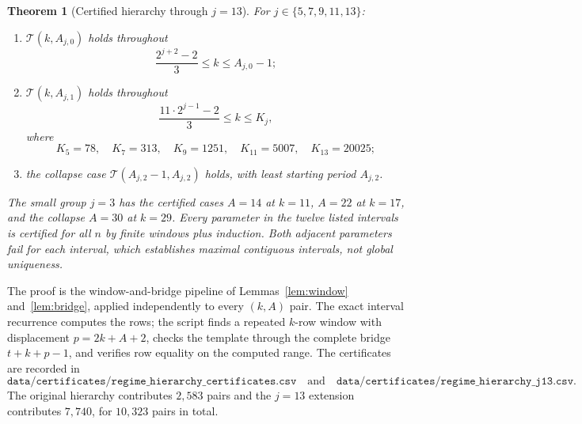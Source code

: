 \documentclass[11pt]{article}
\newtheorem{theorem}{Theorem}[section]
\theoremstyle{remark}
\begin{document}
\begin{theorem}[Certified hierarchy through \(j=13\)]\label{thm:hierarchy}
For \(j\in\{5,7,9,11,13\}\):
\begin{enumerate}[label=(\alph*)]
\item \(\mathcal T(k,A_{j,0})\) holds throughout
\begin{equation}\label{eq:kmin0}
\frac{2^{j+2}-2}{3}\le k\le A_{j,0}-1;
\end{equation}
\item \(\mathcal T(k,A_{j,1})\) holds throughout
\begin{equation}\label{eq:kmin1}
\frac{11\cdot2^{j-1}-2}{3}\le k\le K_j,
\end{equation}
where
\[
K_5=78,\quad K_7=313,\quad K_9=1251,\quad K_{11}=5007,\quad K_{13}=20025;
\]
\item the collapse case \(\mathcal T(A_{j,2}-1,A_{j,2})\) holds, with least starting period \(A_{j,2}\).
\end{enumerate}
The small group \(j=3\) has the certified cases \(A=14\) at \(k=11\), \(A=22\) at \(k=17\), and the collapse \(A=30\) at \(k=29\). Every parameter in the twelve listed intervals is certified for all \(n\) by finite windows plus induction. Both adjacent parameters fail for each interval, which establishes maximal contiguous intervals, not global uniqueness.
\end{theorem}

The proof is the window-and-bridge pipeline of Lemmas~\ref{lem:window} and~\ref{lem:bridge}, applied independently to every \((k,A)\) pair. The exact interval recurrence computes the rows; the script finds a repeated \(k\)-row window with displacement \(p=2k+A+2\), checks the template through the complete bridge \(t+k+p-1\), and verifies row equality on the computed range. The certificates are recorded in
\[
\texttt{data/certificates/regime\_hierarchy\_certificates.csv}
\quad\text{and}\quad
\texttt{data/certificates/regime\_hierarchy\_j13.csv}.
\]
The original hierarchy contributes \(2{,}583\) pairs and the \(j=13\) extension contributes \(7{,}740\), for \(10{,}323\) pairs in total.
\end{document}
